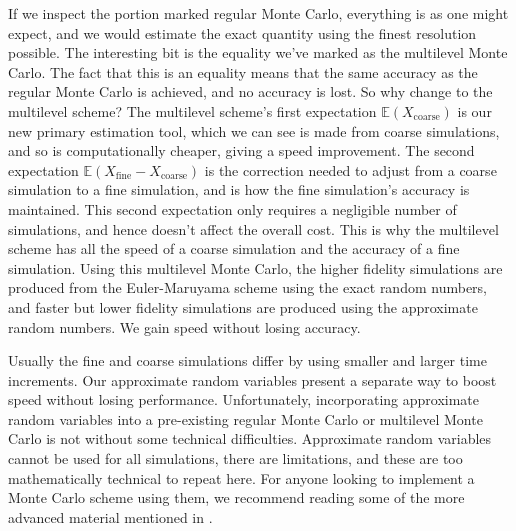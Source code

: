 \documentclass[11pt,a4paper,twoside,english]{extarticle}
\begin{document}
If we inspect the portion marked regular Monte Carlo, everything is as one might expect, and we would estimate the exact quantity using the finest resolution possible. The interesting bit is the equality we've marked as the multilevel Monte Carlo. The fact that this is an equality means that the same accuracy as the regular Monte Carlo is achieved, and no accuracy is lost. So why change to the multilevel scheme? The multilevel scheme's first expectation $ \mathbb{E}(X_{\mathrm{coarse}}) $ is our new primary estimation tool, which we can see is made from coarse simulations, and so is computationally  cheaper, giving a speed improvement. The second expectation $ \mathbb{E}(X_{\mathrm{fine}} - X_{\mathrm{coarse}}) $ is the correction needed to adjust from a coarse simulation to a fine simulation, and is how the fine simulation's accuracy is maintained. This second expectation only requires a negligible number of simulations, and hence doesn't affect the overall cost. This is why the multilevel scheme has all the speed of a coarse simulation and the accuracy of a fine simulation. Using this multilevel Monte Carlo, the higher fidelity simulations are produced from the Euler-Maruyama scheme using the exact random numbers, and faster but lower fidelity simulations are produced using the approximate random numbers. We gain speed without losing accuracy.

Usually the fine and coarse simulations differ by using smaller and larger time increments. Our approximate random variables present a separate way to boost speed without losing performance. Unfortunately, incorporating approximate random variables into a pre-existing regular Monte Carlo or multilevel Monte Carlo is not without some technical difficulties. Approximate random variables cannot be used for all simulations, there are limitations, and these are too mathematically technical to repeat here. For anyone looking to implement a  Monte Carlo scheme using them, we recommend reading some of the more advanced material mentioned in .
\end{document}
